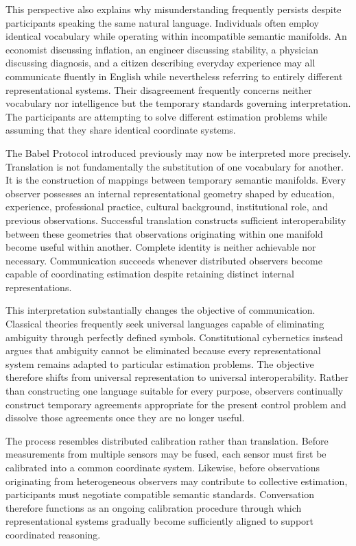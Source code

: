 \documentclass[12pt,a4paper]{article}
\begin{document}
This perspective also explains why misunderstanding frequently persists despite participants speaking the same natural language. Individuals often employ identical vocabulary while operating within incompatible semantic manifolds. An economist discussing inflation, an engineer discussing stability, a physician discussing diagnosis, and a citizen describing everyday experience may all communicate fluently in English while nevertheless referring to entirely different representational systems. Their disagreement frequently concerns neither vocabulary nor intelligence but the temporary standards governing interpretation. The participants are attempting to solve different estimation problems while assuming that they share identical coordinate systems.

The Babel Protocol introduced previously may now be interpreted more precisely. Translation is not fundamentally the substitution of one vocabulary for another. It is the construction of mappings between temporary semantic manifolds. Every observer possesses an internal representational geometry shaped by education, experience, professional practice, cultural background, institutional role, and previous observations. Successful translation constructs sufficient interoperability between these geometries that observations originating within one manifold become useful within another. Complete identity is neither achievable nor necessary. Communication succeeds whenever distributed observers become capable of coordinating estimation despite retaining distinct internal representations.

This interpretation substantially changes the objective of communication. Classical theories frequently seek universal languages capable of eliminating ambiguity through perfectly defined symbols. Constitutional cybernetics instead argues that ambiguity cannot be eliminated because every representational system remains adapted to particular estimation problems. The objective therefore shifts from universal representation to universal interoperability. Rather than constructing one language suitable for every purpose, observers continually construct temporary agreements appropriate for the present control problem and dissolve those agreements once they are no longer useful.

The process resembles distributed calibration rather than translation. Before measurements from multiple sensors may be fused, each sensor must first be calibrated into a common coordinate system. Likewise, before observations originating from heterogeneous observers may contribute to collective estimation, participants must negotiate compatible semantic standards. Conversation therefore functions as an ongoing calibration procedure through which representational systems gradually become sufficiently aligned to support coordinated reasoning.
\end{document}

